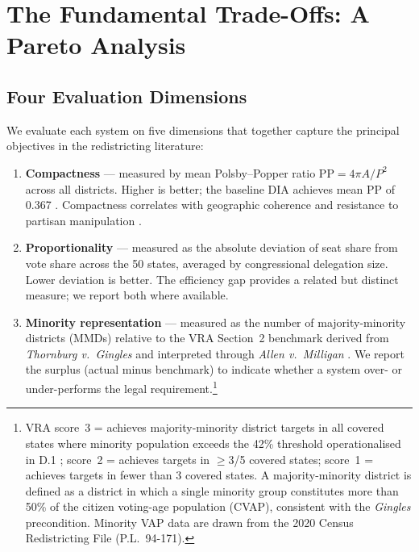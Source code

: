 \section{The Fundamental Trade-Offs: A Pareto Analysis}
\label{sec:tradeoffs}

\subsection{Four Evaluation Dimensions}

We evaluate each system on five dimensions that together capture the principal
objectives in the redistricting literature:

\begin{enumerate}
  \item \textbf{Compactness} --- measured by mean Polsby--Popper ratio
        $\mathrm{PP} = 4\pi A / P^2$ across all districts.  Higher is better;
        the baseline DIA achieves mean PP of 0.367 \citep{dellaLibera2026mec}.
        Compactness correlates with geographic coherence and resistance to
        partisan manipulation \citep{polsby1991third}.

  \item \textbf{Proportionality} --- measured as the absolute deviation of
        seat share from vote share across the 50 states, averaged by
        congressional delegation size.  Lower deviation is better.  The
        efficiency gap \citep{stephanopoulos2015partisan} provides a related
        but distinct measure; we report both where available.

  \item \textbf{Minority representation} --- measured as the number of
        majority-minority districts (MMDs) relative to the VRA Section~2
        benchmark derived from \emph{Thornburg v.\ Gingles}
        \citep{gingles1986} and interpreted through \emph{Allen v.\ Milligan}
        \citep{allen2023}.  We report the surplus (actual minus benchmark)
        to indicate whether a system over- or under-performs the legal
        requirement.\footnote{VRA score~3 = achieves majority-minority district
        targets in all covered states where minority population exceeds the 42\%
        threshold operationalised in D.1 \citep{dellaLibera2026d1}; score~2 =
        achieves targets in $\geq$3/5 covered states; score~1 = achieves
        targets in fewer than 3 covered states.  A majority-minority district
        is defined as a district in which a single minority group constitutes
        more than 50\% of the citizen voting-age population (CVAP), consistent
        with the \emph{Gingles} precondition.  Minority VAP data are drawn from
        the 2020 Census Redistricting File (P.L.\ 94-171).}


\end{enumerate}
